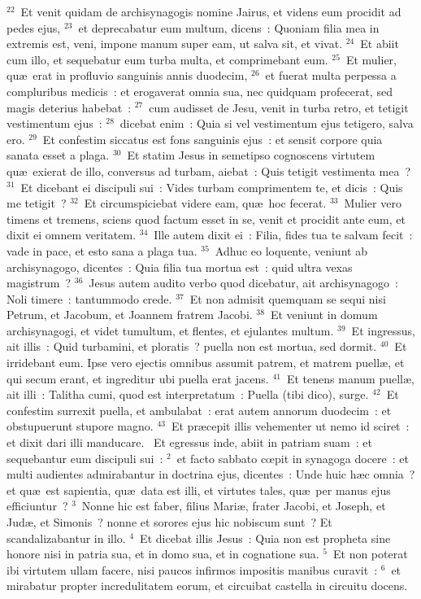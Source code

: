 ${}^{22}$~Et venit quidam de archisynagogis nomine Jairus, et videns eum procidit ad pedes ejus,
${}^{23}$~et deprecabatur eum multum, dicens~: Quoniam filia mea in extremis est, veni, impone manum super eam, ut salva sit, et vivat.
${}^{24}$~Et abiit cum illo, et sequebatur eum turba multa, et comprimebant eum.
${}^{25}$~Et mulier, qu\ae\ erat in profluvio sanguinis annis duodecim,
${}^{26}$~et fuerat multa perpessa a compluribus medicis~: et erogaverat omnia sua, nec quidquam profecerat, sed magis deterius habebat~:
${}^{27}$~cum audisset de Jesu, venit in turba retro, et tetigit vestimentum ejus~:
${}^{28}$~dicebat enim~: Quia si vel vestimentum ejus tetigero, salva ero.
${}^{29}$~Et confestim siccatus est fons sanguinis ejus~: et sensit corpore quia sanata esset a plaga.
${}^{30}$~Et statim Jesus in semetipso cognoscens virtutem qu\ae\ exierat de illo, conversus ad turbam, aiebat~: Quis tetigit vestimenta mea~?
${}^{31}$~Et dicebant ei discipuli sui~: Vides turbam comprimentem te, et dicis~: Quis me tetigit~?
${}^{32}$~Et circumspiciebat videre eam, qu\ae\ hoc fecerat.
${}^{33}$~Mulier vero timens et tremens, sciens quod factum esset in se, venit et procidit ante eum, et dixit ei omnem veritatem.
${}^{34}$~Ille autem dixit ei~: Filia, fides tua te salvam fecit~: vade in pace, et esto sana a plaga tua.
${}^{35}$~Adhuc eo loquente, veniunt ab archisynagogo, dicentes~: Quia filia tua mortua est~: quid ultra vexas magistrum~?
${}^{36}$~Jesus autem audito verbo quod dicebatur, ait archisynagogo~: Noli timere~: tantummodo crede.
${}^{37}$~Et non admisit quemquam se sequi nisi Petrum, et Jacobum, et Joannem fratrem Jacobi.
${}^{38}$~Et veniunt in domum archisynagogi, et videt tumultum, et flentes, et ejulantes multum.
${}^{39}$~Et ingressus, ait illis~: Quid turbamini, et ploratis~? puella non est mortua, sed dormit.
${}^{40}$~Et irridebant eum. Ipse vero ejectis omnibus assumit patrem, et matrem puell\ae , et qui secum erant, et ingreditur ubi puella erat jacens.
${}^{41}$~Et tenens manum puell\ae , ait illi~: Talitha cumi, quod est interpretatum~: Puella (tibi dico), surge.
${}^{42}$~Et confestim surrexit puella, et ambulabat~: erat autem annorum duodecim~: et obstupuerunt stupore magno.
${}^{43}$~Et pr\ae cepit illis vehementer ut nemo id sciret~: et dixit dari illi manducare.
~Et egressus inde, abiit in patriam suam~: et sequebantur eum discipuli sui~:
${}^{2}$~et facto sabbato cœpit in synagoga docere~: et multi audientes admirabantur in doctrina ejus, dicentes~: Unde huic h\ae c omnia~? et qu\ae\ est sapientia, qu\ae\ data est illi, et virtutes tales, qu\ae\ per manus ejus efficiuntur~?
${}^{3}$~Nonne hic est faber, filius Mari\ae , frater Jacobi, et Joseph, et Jud\ae , et Simonis~? nonne et sorores ejus hic nobiscum sunt~? Et scandalizabantur in illo.
${}^{4}$~Et dicebat illis Jesus~: Quia non est propheta sine honore nisi in patria sua, et in domo sua, et in cognatione sua.
${}^{5}$~Et non poterat ibi virtutem ullam facere, nisi paucos infirmos impositis manibus curavit~:
${}^{6}$~et mirabatur propter incredulitatem eorum, et circuibat castella in circuitu docens.


